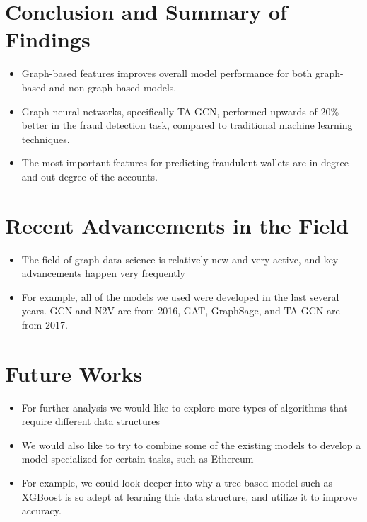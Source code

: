 \documentclass[article,36pt,extrafontsizes,oneside,openany,oldfontcommands]{memoir}
\begin{document}
\begin{adjmulticols*}{3}{0.5in}{0.5in}
\section{Conclusion and Summary of Findings}
\begin{adjustwidth}{0.1in}{0in}
\begin{itemize}[topsep=0pt,itemsep=0ex,partopsep=0ex,parsep=0ex]
\item Graph-based features improves overall model performance for both graph-based and non-graph-based models.
\item Graph neural networks, specifically TA-GCN, performed upwards of 20\% better in the fraud detection task, compared to traditional machine learning techniques.
\item The most important features for predicting  fraudulent wallets are in-degree and out-degree of the accounts.
\end{itemize} 
\end{adjustwidth}


\section{Recent Advancements in the Field}
\begin{adjustwidth}{0.1in}{0in}
\begin{itemize}[topsep=0pt,itemsep=0ex,partopsep=0ex,parsep=0ex]
\item The field of graph data science is relatively new and very active, and key advancements happen very frequently
\item For example, all of the models we used were developed in the last several years. GCN and N2V are from 2016, GAT, GraphSage, and TA-GCN are from 2017.
\end{itemize} 
\end{adjustwidth}


\section{Future Works}
\begin{adjustwidth}{0.1in}{0in}
\begin{itemize}[topsep=0pt,itemsep=0ex,partopsep=0ex,parsep=0ex]
\item For further analysis we would like to explore more types of algorithms that require different data structures
\item We would also like to try to combine some of the existing models to develop a model specialized for certain tasks, such as Ethereum
\item For example, we could look deeper into why a tree-based model such as XGBoost is so adept at learning this data structure, and utilize it to improve accuracy.
\end{itemize} 
\end{adjustwidth}



\end{adjmulticols*}
\end{document}

